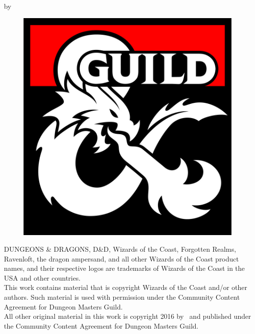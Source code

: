 \begin{titlepage}
\begin{onecolumn}
\begin{center}
            
            \vfill
            {\Large by \bookauthor}
            
        \end{center}


        \begin{minipage}{0.94\textwidth}
            {%
            \setlength\intextsep{0pt}
            \begin{figure}
                \centering
                \includegraphics[width=\linewidth]{images/dmsguild.jpg}  
                    \end{figure}
            {\footnotesize
                DUNGEONS \& DRAGONS, D\&D, Wizards of the Coast, Forgotten Realms, Ravenloft, the dragon ampersand, and all other Wizards of the Coast product names, and their respective logos are trademarks of Wizards of the Coast in the USA and other countries.\\
                This work contains material that is copyright Wizards of the Coast and/or other authors. Such material is used with permission under the Community Content Agreement for Dungeon Masters Guild.\\
                All other original material in this work is copyright 2016 by \bookauthor\ and published under the Community Content Agreement for Dungeon Masters Guild.\\}
            }
        \end{minipage}
    \end{onecolumn}
\end{titlepage}
\clearpage

\setcounter{tocdepth}{2} %
\tableofcontents